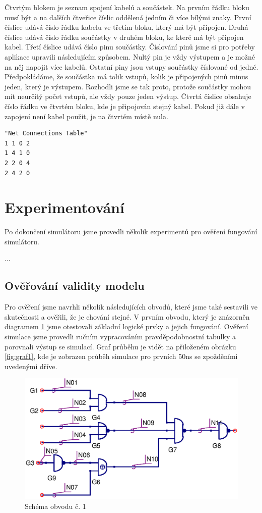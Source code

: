 \documentclass[11pt,a4paper]{article}
\begin{document}
			Čtvrtým blokem je seznam spojení kabelů a součástek. Na prvním řádku bloku musí být  a na dalších čtveřice číslic oddělená jedním či více bílými znaky. První číslice udává číslo řádku kabelu ve třetím bloku, který má být připojen. Druhá číslice udává číslo řádku součástky v druhém bloku, ke které má být připojen kabel. Třetí číslice udává číslo pinu součástky. Číslování pinů jsme si pro potřeby aplikace upravili následujícím způsobem. Nultý pin je vždy výstupem a je možné na něj napojit více kabelů. Ostatní piny jsou vstupy součástky číslované od jedné. Předpokládáme, že součástka má tolik vstupů, kolik je připojených pinů minus jeden, který je výstupem. Rozhodli jsme se tak proto, protože součástky mohou mít neurčitý počet vstupů, ale vždy pouze jeden výstup. Čtvrtá číslice obsahuje číslo řádku ve čtvrtém bloku, kde je připojován stejný kabel. Pokud již dále v zapojení není kabel použit, je na čtvrtém místě nula.

\begin{lstlisting}[caption=Příklad bloku propojení]
"Net Connections Table"
1 1 0 2
1 4 1 0
2 2 0 4
2 4 2 0
\end{lstlisting}


	\section{Experimentování}
		Po dokončení simulátoru jsme provedli několik experimentů pro ověření fungování simulátoru.

		...

		\subsection{Ověřování validity modelu}
			\label{validity}
			Pro ověření jsme navrhli několik následujících obvodů, které jsme také sestavili ve skutečnosti a ověřili, že je chování stejné. V prvním obvodu, který je znázorněn diagramem \ref{fig:scheme1} jsme otestovali základní logické prvky a jejich fungování. Ověření simulace jsme provedli ručním vypracováním pravděpodobnostní tabulky a porovnali výstup se simulací. Graf průběhu je vidět na přiloženém obrázku \ref{fig:graf1}, kde je zobrazen průběh simulace pro prvních 50ns se zpožděními uvedenými dříve.


			\begin{figure}[!htb]
				\centering
					\includegraphics[scale=.7]{input1.eps}
					\caption{Schéma obvodu č. 1}
					\label{fig:scheme1}
			\end{figure}
\end{document}
